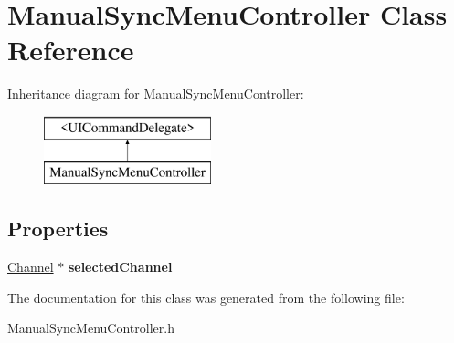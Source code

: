 \hypertarget{interface_manual_sync_menu_controller}{
\section{\-Manual\-Sync\-Menu\-Controller \-Class \-Reference}
\label{interface_manual_sync_menu_controller}
}
\-Inheritance diagram for \-Manual\-Sync\-Menu\-Controller\-:\begin{figure}[H]
\begin{center}
\leavevmode
\includegraphics[height=2.000000cm]{interface_manual_sync_menu_controller}
\end{center}
\end{figure}
\subsection*{\-Properties}
\begin{DoxyCompactItemize}
\item 
\hypertarget{interface_manual_sync_menu_controller_ab85bb7b200b371b33eae77135a05f0a4}{
\hyperlink{interface_channel}{\-Channel} $\ast$ {\bfseries selected\-Channel}}
\label{interface_manual_sync_menu_controller_ab85bb7b200b371b33eae77135a05f0a4}

\end{DoxyCompactItemize}


\-The documentation for this class was generated from the following file\-:\begin{DoxyCompactItemize}
\item 
\-Manual\-Sync\-Menu\-Controller.\-h\end{DoxyCompactItemize}
